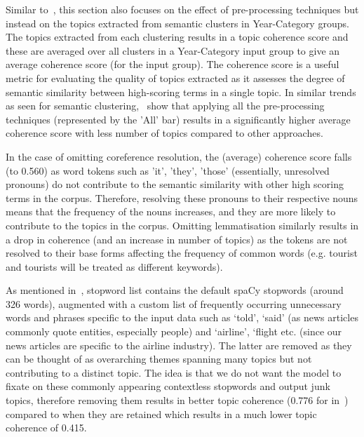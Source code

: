 \vspace*{-1em}
 Similar to~, this section also focuses on the effect of pre-processing techniques but instead on the topics extracted from semantic clusters in Year-Category groups. The topics extracted from each clustering results in a topic coherence score and these are averaged over all clusters in a Year-Category input group to give an average coherence score (for the input group). The coherence score is a useful metric for evaluating the quality of topics extracted as it assesses the degree of semantic similarity between high-scoring terms in a single topic. In similar trends as seen for semantic clustering,~ show that applying all the pre-processing techniques (represented by the 'All' bar) results in a significantly higher average coherence score with less number of topics compared to other approaches.  

In the case of omitting coreference resolution, the (average) coherence score falls (to 0.560) as word tokens such as 'it', 'they', 'those' (essentially, unresolved pronouns) do not contribute to the semantic similarity with other high scoring terms in the corpus. Therefore, resolving these pronouns to their respective nouns means that the frequency of the nouns increases, and they are more likely to contribute to the topics in the corpus. Omitting lemmatisation similarly results in a drop in coherence (and an increase in number of topics) as the tokens are not resolved to their base forms affecting the frequency of common words (e.g. tourist and tourists will be treated as different keywords).

As mentioned in~, stopword list contains the default spaCy stopwords (around 326 words), augmented with a custom list of frequently occurring unnecessary words and phrases specific to the input data such as `told', `said' (as news articles commonly quote entities, especially people) and `airline', `flight etc. (since our news articles are specific to the airline industry). The latter are removed as they can be thought of as overarching themes spanning many topics but not contributing to a distinct topic. The idea is that we do not want the model to fixate on these commonly appearing contextless stopwords and output junk topics, therefore removing them results in better topic coherence (0.776 for  in~) compared to when they are retained which results in a much lower topic coherence of 0.415.

